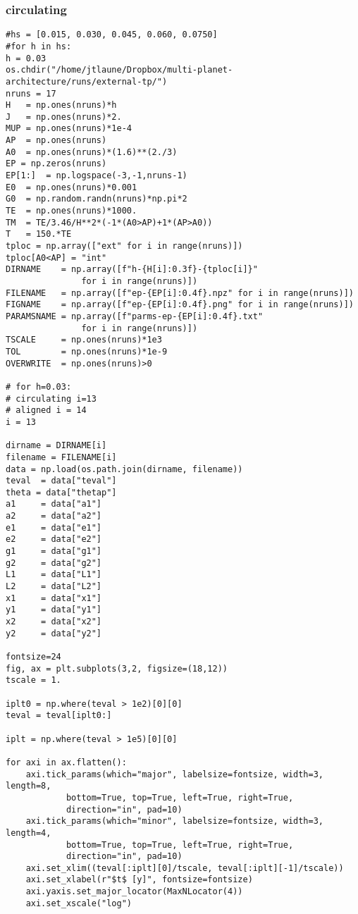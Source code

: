 \documentclass[11pt]{article}
\begin{document}
\subsubsection{circulating}
\label{sec:org1fc6a01}
\begin{verbatim}
#hs = [0.015, 0.030, 0.045, 0.060, 0.0750]
#for h in hs:
h = 0.03
os.chdir("/home/jtlaune/Dropbox/multi-planet-architecture/runs/external-tp/")
nruns = 17
H   = np.ones(nruns)*h
J   = np.ones(nruns)*2.
MUP = np.ones(nruns)*1e-4
AP  = np.ones(nruns)
A0  = np.ones(nruns)*(1.6)**(2./3)
EP = np.zeros(nruns)
EP[1:]  = np.logspace(-3,-1,nruns-1)
E0  = np.ones(nruns)*0.001
G0  = np.random.randn(nruns)*np.pi*2
TE  = np.ones(nruns)*1000.
TM  = TE/3.46/H**2*(-1*(A0>AP)+1*(AP>A0))
T   = 150.*TE
tploc = np.array(["ext" for i in range(nruns)])
tploc[A0<AP] = "int"
DIRNAME    = np.array([f"h-{H[i]:0.3f}-{tploc[i]}"
		       for i in range(nruns)])
FILENAME   = np.array([f"ep-{EP[i]:0.4f}.npz" for i in range(nruns)])
FIGNAME    = np.array([f"ep-{EP[i]:0.4f}.png" for i in range(nruns)])
PARAMSNAME = np.array([f"parms-ep-{EP[i]:0.4f}.txt"
		       for i in range(nruns)])
TSCALE     = np.ones(nruns)*1e3
TOL        = np.ones(nruns)*1e-9
OVERWRITE  = np.ones(nruns)>0

# for h=0.03:
# circulating i=13
# aligned i = 14
i = 13

dirname = DIRNAME[i]
filename = FILENAME[i]
data = np.load(os.path.join(dirname, filename))
teval  = data["teval"]
theta = data["thetap"]
a1     = data["a1"]
a2     = data["a2"]
e1     = data["e1"]
e2     = data["e2"]
g1     = data["g1"]
g2     = data["g2"]
L1     = data["L1"]
L2     = data["L2"]
x1     = data["x1"]
y1     = data["y1"]
x2     = data["x2"]
y2     = data["y2"]

fontsize=24
fig, ax = plt.subplots(3,2, figsize=(18,12))
tscale = 1.

iplt0 = np.where(teval > 1e2)[0][0]
teval = teval[iplt0:]

iplt = np.where(teval > 1e5)[0][0]

for axi in ax.flatten():
    axi.tick_params(which="major", labelsize=fontsize, width=3, length=8,
		    bottom=True, top=True, left=True, right=True,
		    direction="in", pad=10)
    axi.tick_params(which="minor", labelsize=fontsize, width=3, length=4,
		    bottom=True, top=True, left=True, right=True,
		    direction="in", pad=10)
    axi.set_xlim((teval[:iplt][0]/tscale, teval[:iplt][-1]/tscale))
    axi.set_xlabel(r"$t$ [y]", fontsize=fontsize)
    axi.yaxis.set_major_locator(MaxNLocator(4))
    axi.set_xscale("log")


\end{verbatim}
\end{document}
